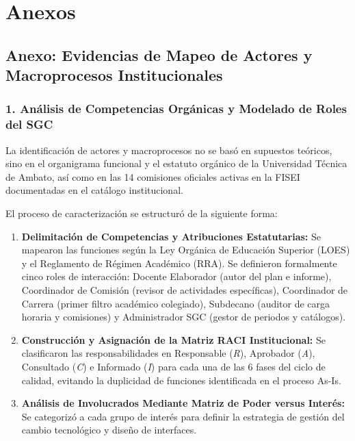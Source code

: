 \documentclass[12pt,a4paper]{article}
\begin{document}
\vspace{0.4cm}

\section{Anexos}

\subsection*{Anexo: Evidencias de Mapeo de Actores y Macroprocesos Institucionales}

\subsubsection*{1. Análisis de Competencias Orgánicas y Modelado de Roles del SGC}
La identificación de actores y macroprocesos no se basó en supuestos teóricos, sino en el organigrama funcional y el estatuto orgánico de la Universidad Técnica de Ambato, así como en las 14 comisiones oficiales activas en la FISEI documentadas en el catálogo institucional.

El proceso de caracterización se estructuró de la siguiente forma:
\begin{enumerate}[leftmargin=1.5em, itemsep=2pt]
    \item \textbf{Delimitación de Competencias y Atribuciones Estatutarias:} Se mapearon las funciones según la Ley Orgánica de Educación Superior (LOES) y el Reglamento de Régimen Académico (RRA). Se definieron formalmente cinco roles de interacción: Docente Elaborador (autor del plan e informe), Coordinador de Comisión (revisor de actividades específicas), Coordinador de Carrera (primer filtro académico colegiado), Subdecano (auditor de carga horaria y comisiones) y Administrador SGC (gestor de periodos y catálogos).
    \item \textbf{Construcción y Asignación de la Matriz RACI Institucional:} Se clasificaron las responsabilidades en Responsable (\textit{R}), Aprobador (\textit{A}), Consultado (\textit{C}) e Informado (\textit{I}) para cada una de las 6 fases del ciclo de calidad, evitando la duplicidad de funciones identificada en el proceso As-Is.
    \item \textbf{Análisis de Involucrados Mediante Matriz de Poder versus Interés:} Se categorizó a cada grupo de interés para definir la estrategia de gestión del cambio tecnológico y diseño de interfaces.
\end{enumerate}
\end{document}
